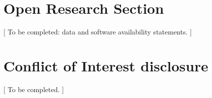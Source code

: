 \documentclass[draft]{agujournal2019}
\begin{document}


%
%

\section*{Open Research Section}
[ To be completed: data and software availability statements. ]

\section*{Conflict of Interest disclosure}
[ To be completed. ]

\acknowledgments
[ To be completed. ]


%


\end{document}
